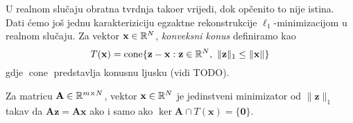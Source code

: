 \documentclass[a4paper,twoside,12pt]{memoir} %
\newcommand{\vect}[1]{\mathbf{#1}}
\renewcommand{\vec}{\vect}
\newcommand{\norm}[1]{\|{#1}\|}
\DeclareMathOperator{\cone}{cone}
\begin{document}
U realnom slu\v{c}aju obratna tvrdnja tako\dj er vrijedi, dok op\v{c}enito to nije istina. Dati \'cemo jo\v{s} jednu karakteriziciju egzaktne rekonstrukcije $\ell_1$-minimizacijom u realnom slu\v{c}aju. Za vektor $\vec x \in \R^N$, \textit{konveksni konus} definiramo kao
\begin{equation}\label{4:34}
    T(\vec x) = \cone \{ \vec z - \vec x : \vec z \in \R^N,\ \norm{\vec z}_1 \leq \norm{\vec x}\} 
\end{equation}
gdje $\cone$ predstavlja konusnu ljusku (vidi TODO).
\begin{thm}
    Za matricu $\vec A \in \R^{m \times N}$, vektor $\vec x \in \R^N$ je jedinstveni minimizator od $\norm{\vec z}_1$ takav da $\vec{Az} = \vec{Ax}$ ako i samo ako $\ker \vec A \cap T(\vec x) = \{\vec 0\}$.
\end{thm}
\end{document}
